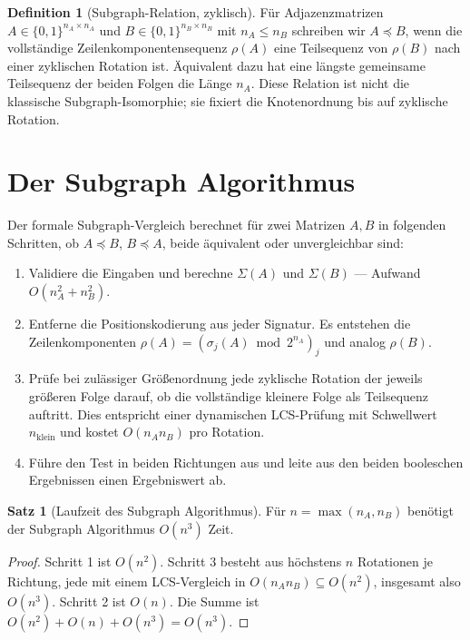 \documentclass[a4paper,12pt, twoside]{report}
\theoremstyle{definition}
\newtheorem{definition}{Definition}
\newtheorem{satz}{Satz}
\begin{document}
\begin{definition}[Subgraph-Relation, zyklisch]
	Für Adjazenzmatrizen $A \in \{0,1\}^{n_A \times n_A}$ und $B \in \{0,1\}^{n_B \times n_B}$ mit $n_A \le n_B$ schreiben wir $A \preceq B$, wenn die vollständige Zeilenkomponentensequenz $\rho(A)$ eine Teilsequenz von $\rho(B)$ nach einer zyklischen Rotation ist. Äquivalent dazu hat eine längste gemeinsame Teilsequenz der beiden Folgen die Länge $n_A$. Diese Relation ist nicht die klassische Subgraph-Isomorphie; sie fixiert die Knotenordnung bis auf zyklische Rotation.
\end{definition}

\section{Der Subgraph Algorithmus}

Der formale Subgraph-Vergleich \cite{epp2026subgraph} berechnet für zwei Matrizen $A, B$ in folgenden Schritten, ob $A \preceq B$, $B \preceq A$, beide äquivalent oder unvergleichbar sind:

\begin{enumerate}
	\item Validiere die Eingaben und berechne $\Sigma(A)$ und $\Sigma(B)$ — Aufwand $O(n_A^2+n_B^2)$.
	\item Entferne die Positionskodierung aus jeder Signatur. Es entstehen die Zeilenkomponenten $\rho(A)=(\sigma_j(A)\bmod 2^{n_A})_j$ und analog $\rho(B)$.
	\item Prüfe bei zulässiger Größenordnung jede zyklische Rotation der jeweils größeren Folge darauf, ob die vollständige kleinere Folge als Teilsequenz auftritt. Dies entspricht einer dynamischen LCS-Prüfung mit Schwellwert $n_{\mathrm{klein}}$ und kostet $O(n_A n_B)$ pro Rotation.
	\item Führe den Test in beiden Richtungen aus und leite aus den beiden booleschen Ergebnissen einen Ergebniswert ab.
\end{enumerate}

\begin{satz}[Laufzeit des Subgraph Algorithmus]
	\label{satz:laufzeit}
	Für $n = \max(n_A, n_B)$ benötigt der Subgraph Algorithmus $O(n^3)$ Zeit.
\end{satz}

\begin{proof}
	Schritt 1 ist $O(n^2)$. Schritt 3 besteht aus höchstens $n$ Rotationen je Richtung, jede mit einem LCS-Vergleich in $O(n_A n_B)\subseteq O(n^2)$, insgesamt also $O(n^3)$. Schritt 2 ist $O(n)$. Die Summe ist $O(n^2)+O(n)+O(n^3)=O(n^3)$.
\end{proof}
\end{document}
